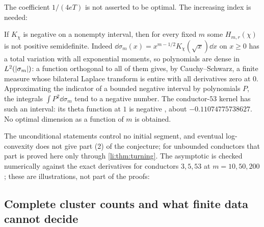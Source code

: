 The coefficient $1/(4eT)$ is not asserted to be optimal. The increasing index is needed:

\begin{remark}\label{li:rem:centralfixed}
If $K_\chi$ is negative on a nonempty interval, then for every fixed $m$ some $H_{m,r}(\chi)$ is not positive
semidefinite. Indeed $\dd\sigma_m(x)=x^{m-1/2}K_\chi(\sqrt x)\dd x$ on $x\ge0$ has a total variation with all
exponential moments, so polynomials are dense in $L^2(\lvert\sigma_m\rvert)$: a function orthogonal to all of
them gives, by Cauchy--Schwarz, a finite measure whose bilateral Laplace transform is entire with all
derivatives zero at $0$. Approximating the indicator of a bounded negative interval by polynomials
$P$, the integrals $\int P^2\dd\sigma_m$ tend to a negative number. The conductor-$53$ kernel has such an
interval: its theta function at $1$ is negative \cite[Section~1.1]{LouboutinMunsch2013Positive}, about
$-0.11074775738627$. No optimal dimension as a function of $m$ is obtained.
\end{remark}

The unconditional statements control no initial segment, and eventual log-convexity does not give part
(2) of the conjecture; for unbounded conductors that part is proved here only through
\cref{li:thm:turning}. The asymptotic is checked numerically against the exact derivatives for
conductors $3,5,53$ at $m=10,50,200$; these are illustrations, not part of the proofs:
\begin{center}\small
{}
\end{center}

\subsection{Complete cluster counts and what finite data cannot decide}\label{li:sec:cluster}


